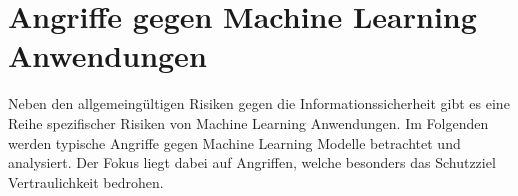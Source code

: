 \chapter{Angriffe gegen Machine Learning Anwendungen}\label{sec:angriffe}

Neben den allgemeingültigen Risiken gegen die Informationssicherheit gibt es eine Reihe spezifischer Risiken von Machine Learning Anwendungen.
Im Folgenden werden typische Angriffe gegen Machine Learning Modelle betrachtet und analysiert. 
Der Fokus liegt dabei auf Angriffen, welche besonders das Schutzziel Vertraulichkeit bedrohen.








%